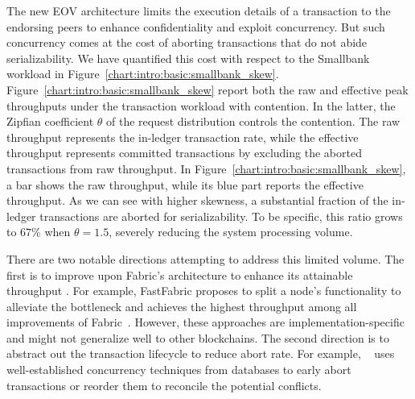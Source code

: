 The new EOV architecture limits the execution details of a transaction to the
endorsing peers to enhance confidentiality and exploit concurrency. But such
concurrency comes at the cost of aborting transactions that do not abide
serializability.
%
We have quantified this cost with respect to the Smallbank workload in Figure~\ref{chart:intro:basic:smallbank_skew}.
%
Figure~\ref{chart:intro:basic:smallbank_skew} report both the raw and effective peak throughputs under the transaction workload with contention. 
%
In the latter, the Zipfian coefficient $\theta$ of the request distribution controls the contention. 
%
The raw throughput represents the in-ledger transaction rate, while the effective throughput represents committed transactions by excluding the aborted transactions from raw throughput. 
%
In Figure~\ref{chart:intro:basic:smallbank_skew}, a bar shows the raw throughput, while its blue part reports the effective throughput. 
%
As we can see with higher skewness, a substantial fraction of the in-ledger transactions are aborted for serializability. 
%
To be specific, this ratio grows to $67$\% when $\theta=1.5$, severely reducing the system processing volume. 


There are two notable directions attempting to address this limited volume. 
%
The first is to improve upon Fabric's architecture to enhance its
attainable throughput \cite{nasir2018performance, thakkar2018performance}.
%
For example, FastFabric proposes to split a node's functionality to alleviate the bottleneck and achieves the highest throughput among all improvements of Fabric~\cite{gorenflo2019fastfabric}. 
%
However, these approaches are implementation-specific and might not generalize well
to other blockchains.
%
The second direction is to abstract out the transaction lifecycle to reduce
abort rate.
%
For example, {\fabricPlusplus}~\cite{sharma2019blurring} uses
well-established concurrency techniques from databases to early abort
transactions or reorder them to reconcile the potential conflicts.

